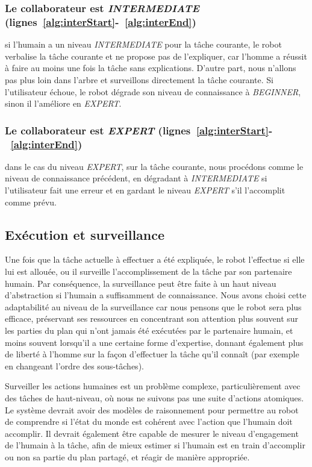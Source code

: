 \documentclass[a4paper,11pt,twoside]{StyleThese}
\begin{document}
\subsubsection{Le collaborateur est \textit{INTERMEDIATE} (lignes~\ref{alg:interStart}-~\ref{alg:interEnd})} si l'humain a un niveau  \textit{INTERMEDIATE} pour la tâche courante, le robot verbalise la tâche courante et ne propose pas de l'expliquer, car l'homme a réussit à faire au moins une fois la tâche sans explications. D'autre part, nous n'allons pas plus loin dans l'arbre et surveillons directement la tâche courante. Si l'utilisateur échoue, le robot dégrade son niveau de connaissance à \textit{BEGINNER}, sinon il l'améliore en \textit{EXPERT}.

\subsubsection{Le collaborateur est \textit{EXPERT} (lignes~\ref{alg:interStart}-~\ref{alg:interEnd})} dans le cas du niveau \textit{EXPERT}, sur la tâche courante, nous procédons comme le niveau de connaissance précédent, en dégradant à \textit{INTERMEDIATE} si l'utilisateur fait une erreur et en gardant le niveau \textit{EXPERT} s'il l'accomplit comme prévu.

\subsection{Exécution et surveillance}
Une fois que la tâche actuelle à effectuer a été expliquée, le robot l'effectue si elle lui est allouée, ou il surveille l'accomplissement de la tâche par son partenaire humain. Par conséquence, la surveillance peut être faite à un haut niveau d'abstraction si l'humain a suffisamment de connaissance.
Nous avons choisi cette adaptabilité au niveau de la surveillance car nous pensons que le robot sera plus efficace, préservant ses ressources en concentrant son attention plus souvent sur les parties du plan qui n'ont jamais été exécutées par le partenaire humain, et moins souvent lorsqu'il a une certaine forme d'expertise, donnant également plus de liberté à l'homme sur la façon d'effectuer la tâche qu'il connaît (par exemple en changeant l'ordre des sous-tâches).

Surveiller les actions humaines est un problème complexe, particulièrement avec des tâches de haut-niveau, où nous ne suivons pas une suite d'actions atomiques. Le système devrait avoir des modèles de raisonnement pour permettre au robot de comprendre si l'état du monde est cohérent avec l'action que l'humain doit accomplir. Il devrait également être capable de mesurer le niveau d'engagement de l'humain à la tâche, afin de mieux estimer si l'humain est en train d'accomplir ou non sa partie du plan partagé, et réagir de manière appropriée.
\end{document}
